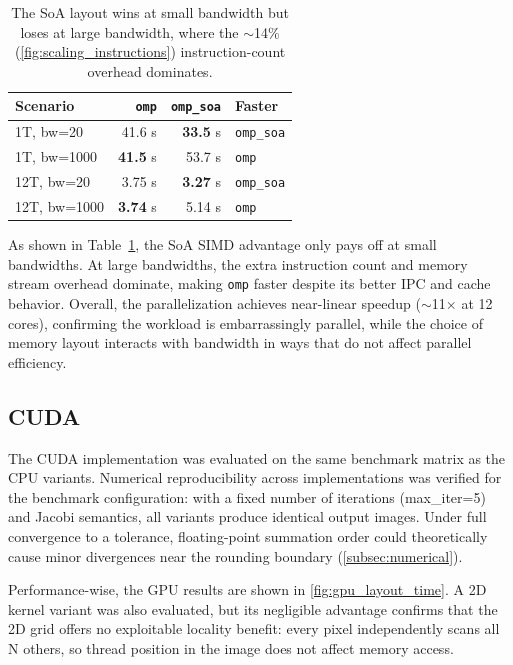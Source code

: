 \documentclass[10pt,twocolumn,letterpaper]{article}
\begin{document}
\begin{table}[htbp]
\centering
\caption{The SoA layout wins at small bandwidth but
         loses at large bandwidth, where the $\sim$14\%(\cref{fig:scaling_instructions}) instruction-count
         overhead dominates.}
\label{tab:omp_comparison}
\begin{tabular}{l r r l}
\toprule
Scenario & \texttt{omp} & \texttt{omp\_soa} & Faster \\
\midrule
1T, bw=20   & 41.6 s & \textbf{33.5} s & \texttt{omp\_soa} \\
1T, bw=1000 & \textbf{41.5} s & 53.7 s & \texttt{omp} \\
12T, bw=20  & 3.75 s & \textbf{3.27} s & \texttt{omp\_soa} \\
12T, bw=1000 & \textbf{3.74} s & 5.14 s & \texttt{omp} \\
\bottomrule
\end{tabular}
\end{table}

As shown in Table~\ref{tab:omp_comparison}, the SoA SIMD advantage only pays off at small bandwidths. At large bandwidths, the extra instruction count and memory stream overhead dominate, making \texttt{omp} faster despite its better IPC and cache behavior. Overall, the parallelization achieves near-linear speedup ($\sim$11$\times$ at 12 cores), confirming the workload is embarrassingly parallel, while the choice of memory layout interacts with bandwidth in ways that do not affect parallel efficiency.

\subsection{CUDA}
The CUDA implementation was evaluated on the same benchmark matrix as the CPU variants. Numerical reproducibility across implementations was verified for the benchmark configuration: with a fixed number of iterations (max\_iter=5) and Jacobi semantics, all variants produce identical output images. Under full convergence to a tolerance, floating-point summation order could theoretically cause minor divergences near the rounding boundary (\cref{subsec:numerical}).

Performance-wise, the GPU results are shown in \cref{fig:gpu_layout_time}. A 2D kernel variant was also evaluated, but its negligible advantage confirms that the 2D grid offers no exploitable locality benefit: every pixel independently scans all N others, so thread position in the image does not affect memory access.
\end{document}
